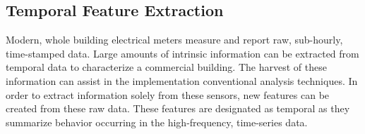 \subsection{Temporal Feature Extraction}
Modern, whole building electrical meters measure and report raw, sub-hourly, time-stamped data. Large amounts of intrinsic information can be extracted from temporal data to characterize a commercial building. The harvest of these information can assist in the implementation conventional analysis techniques. In order to extract information solely from these sensors, new features can be created from these raw data. These features are designated as temporal as they summarize behavior occurring in the high-frequency, time-series data. 
